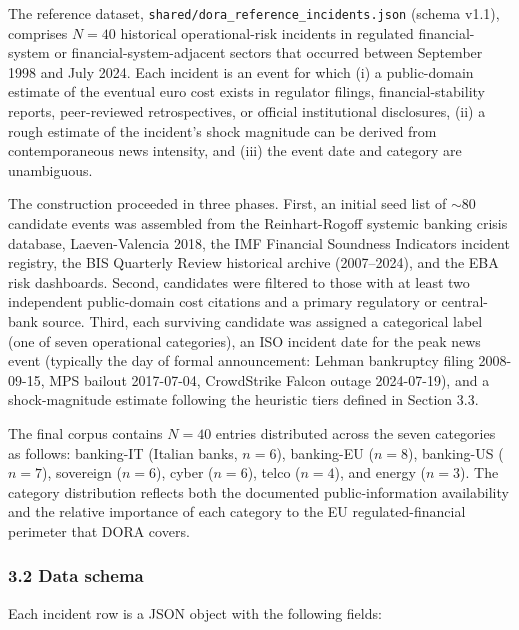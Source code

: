 \documentclass[
]{article}
\begin{document}
The reference dataset, \texttt{shared/dora\_reference\_incidents.json}
(schema v1.1), comprises \(N=40\) historical operational-risk incidents
in regulated financial-system or financial-system-adjacent sectors that
occurred between September 1998 and July 2024. Each incident is an event
for which (i) a public-domain estimate of the eventual euro cost exists
in regulator filings, financial-stability reports, peer-reviewed
retrospectives, or official institutional disclosures, (ii) a rough
estimate of the incident's shock magnitude can be derived from
contemporaneous news intensity, and (iii) the event date and category
are unambiguous.

The construction proceeded in three phases. First, an initial seed list
of \(\sim 80\) candidate events was assembled from the Reinhart-Rogoff
systemic banking crisis database, Laeven-Valencia 2018, the IMF
Financial Soundness Indicators incident registry, the BIS Quarterly
Review historical archive (2007--2024), and the EBA risk dashboards.
Second, candidates were filtered to those with at least two independent
public-domain cost citations and a primary regulatory or central-bank
source. Third, each surviving candidate was assigned a categorical label
(one of seven operational categories), an ISO incident date for the peak
news event (typically the day of formal announcement: Lehman bankruptcy
filing 2008-09-15, MPS bailout 2017-07-04, CrowdStrike Falcon outage
2024-07-19), and a shock-magnitude estimate following the heuristic
tiers defined in Section 3.3.

The final corpus contains \(N=40\) entries distributed across the seven
categories as follows: banking-IT (Italian banks, \(n=6\)), banking-EU
(\(n=8\)), banking-US (\(n=7\)), sovereign (\(n=6\)), cyber (\(n=6\)),
telco (\(n=4\)), and energy (\(n=3\)). The category distribution
reflects both the documented public-information availability and the
relative importance of each category to the EU regulated-financial
perimeter that DORA covers.

\subsubsection{3.2 Data schema}\label{data-schema}

Each incident row is a JSON object with the following fields:
\end{document}
